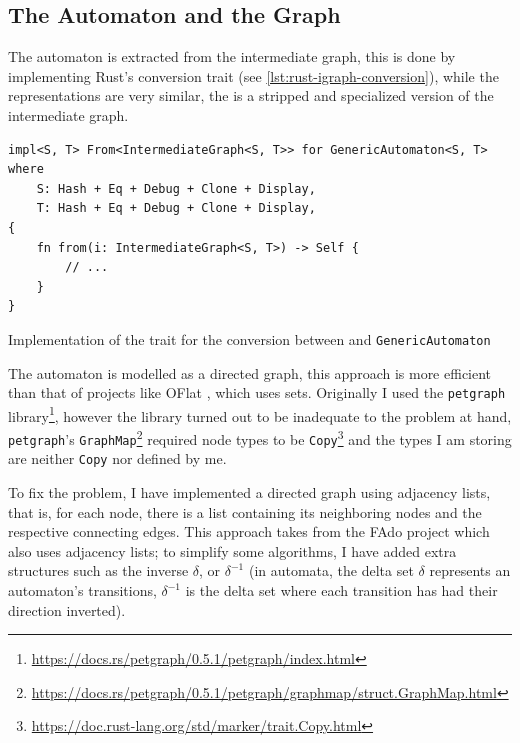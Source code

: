\subsection{The Automaton and the Graph}\label{sec:validation:automaton}

The automaton is extracted from the intermediate graph,
this is done by implementing Rust's  conversion trait (see \autoref{lst:rust-igraph-conversion}),
while the representations are very similar, the  is a stripped and specialized version of the intermediate graph.

\begin{listing}
    \begin{verbatim}
impl<S, T> From<IntermediateGraph<S, T>> for GenericAutomaton<S, T>
where
    S: Hash + Eq + Debug + Clone + Display,
    T: Hash + Eq + Debug + Clone + Display,
{
    fn from(i: IntermediateGraph<S, T>) -> Self {
        // ...
    }
}
    \end{verbatim}
    \caption{Implementation of the  trait for the conversion between  and \texttt{GenericAutomaton}}
    \label{lst:rust-igraph-conversion}
\end{listing}


The automaton is modelled as a directed graph, this approach is more efficient than that of projects like OFlat \autocite{Macedo2019}, which uses sets.
Originally I used the \texttt{petgraph} library\footnote{\url{https://docs.rs/petgraph/0.5.1/petgraph/index.html}},
however the library turned out to be inadequate to the problem at hand,
\texttt{petgraph}'s \texttt{GraphMap}\footnote{\url{https://docs.rs/petgraph/0.5.1/petgraph/graphmap/struct.GraphMap.html}}
required node types to be \texttt{Copy}\footnote{\url{https://doc.rust-lang.org/std/marker/trait.Copy.html}} and
the types I am storing are neither \texttt{Copy} nor defined by me.

To fix the problem, I have implemented a directed graph using adjacency lists, that is, for each node,
there is a list containing its neighboring nodes and the respective connecting edges.
This approach takes from the FAdo \autocite{Reis2002} project which also uses adjacency lists; to simplify some algorithms, %
I have added extra structures such as the inverse $\delta$, or $\delta^{-1}$
(in automata, the delta set $\delta$ represents an automaton's transitions,
$\delta^{-1}$ is the delta set where each transition has had their direction inverted).

